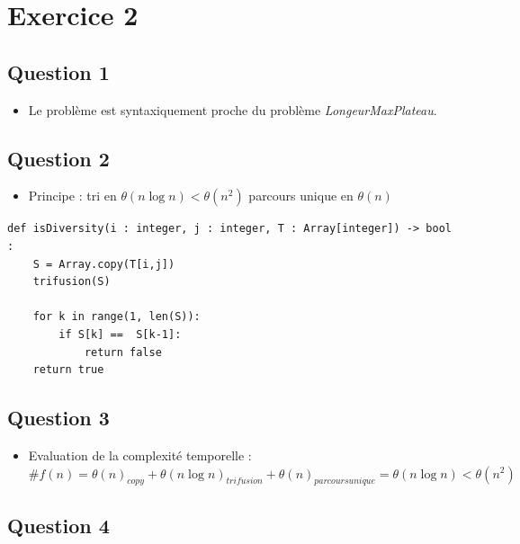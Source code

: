 \documentclass{article}
\begin{document}
\section*{\textbf{Exercice 2}}

\subsection*{Question 1}

\begin{itemize}
    \item Le problème est syntaxiquement proche du problème \textit{LongeurMaxPlateau}.
\end{itemize}

\subsection*{Question 2}

\begin{itemize}
    \item Principe : 
    \subitem tri en $\theta(n\log n) < \theta(n^2) $ 
    \subitem parcours unique en $\theta(n)$ 
\end{itemize}

\begin{lstlisting}[label=python, caption={isDiversity}]
def isDiversity(i : integer, j : integer, T : Array[integer]) -> bool : 
    S = Array.copy(T[i,j])
    trifusion(S)

    for k in range(1, len(S)):
        if S[k] ==  S[k-1]:
            return false
    return true
\end{lstlisting}

\subsection*{Question 3}

\begin{itemize}
    \item Evaluation de la complexité temporelle : 
    \subitem $ \# f(n) = \theta(n)_{copy} + \theta(n \log n)_{trifusion} + \theta(n)_{parcours unique} = \theta(n \log n) < \theta(n^2) $
\end{itemize}

\subsection*{Question 4}
\end{document}
